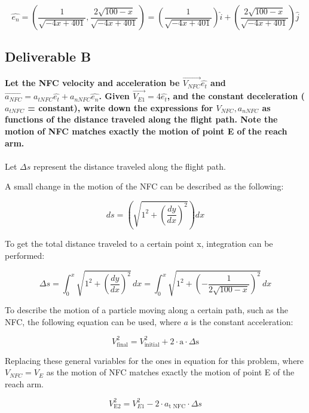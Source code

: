 \documentclass[12pt, a4paper]{article}
\begin{document}
\begin{equation}
    \hat{e_n} = (\frac{1}{\sqrt{-4x+401}},\frac{2\sqrt{100-x}}{\sqrt{-4x+401}}) = (\frac{1}{\sqrt{-4x+401}})\hat{i} + (\frac{2\sqrt{100-x}}{\sqrt{-4x+401}})\hat{j}
\end{equation}

\newpage
\subsection{Deliverable B}

\textbf{Let the NFC velocity and acceleration be $\vec{V_{NFC}}\hat{e_t}$ and $\vec{a_{NFC}} = a_{t NFC}\hat{e_t}+a_{n NFC}\hat{e_n}$. Given $\vec{V_{E1}} = 4\hat{e_t}$, and the constant deceleration ($a_{t NFC}$ = constant), write down the expressions for $V_{NFC}, a_{n NFC}$ as functions of the distance traveled along the flight path. Note the motion of NFC matches exactly the motion of point E of the reach arm.} \\ \\ 

Let $\Delta s$ represent the distance traveled along the flight path.

A small change in the motion of the NFC can be described as the following: 

\begin{equation}
    ds = (\sqrt{1^2+(\frac{dy}{dx})^2})dx
\end{equation}

To get the total distance traveled to a certain point x, integration can be performed: 

\begin{equation}
    \Delta s = \int_{0}^{x} \sqrt{1^2+(\frac{dy}{dx})^2} \, dx = \int_{0}^{x} \sqrt{1^2+(- \frac{1}{2\sqrt{100-x}})^2} \, dx
\end{equation}

To describe the motion of a particle moving along a certain path, such as the NFC, the following equation can be used, where $a$ is the constant acceleration:

\begin{equation}
    V_{\text{final}}^2 = V_{\text{initial}}^2 + 2\cdot{\text{a}}\cdot\Delta{\text{s}}
\end{equation}

Replacing these general variables for the ones in equation for this problem, where $V_{NFC} = V_{E}$ as the motion of NFC matches exactly the motion of point E of the reach arm. 

\begin{equation}
    V_{\text{E2}}^2 = V_{E1}^2 - 2 \cdot a_{\text{t NFC}}\cdot \Delta s
\end{equation}
\end{document}
